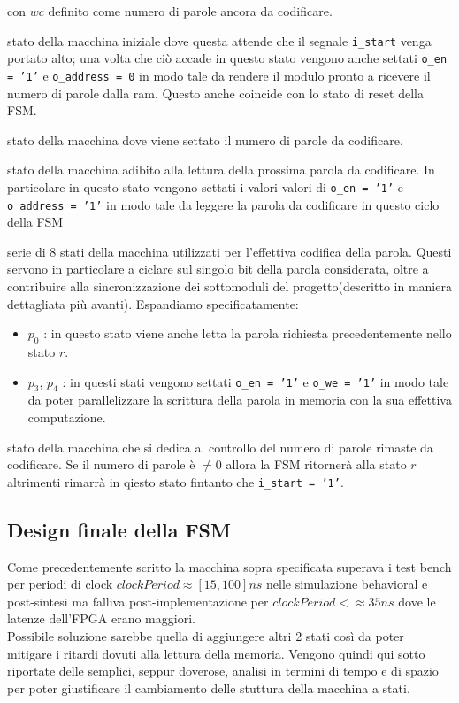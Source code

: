 \documentclass[11pt,a4paper]{article}
\begin{document}
                con $wc$ definito come numero di parole ancora da codificare.
                \begin{description}[leftmargin = 0cm]
                    \item[Idle - $idle$ : ] stato della macchina iniziale dove questa attende che il segnale \texttt{i\_start} venga portato alto; una volta che ciò accade in questo stato vengono anche settati \texttt{o\_en = '1'} e \texttt{o\_address = 0} in modo tale da rendere il modulo pronto a ricevere il numero di parole dalla ram. Questo anche coincide con lo stato di reset della FSM.
                    \item[Read word count - $r_{wc}$ : ] stato della macchina dove viene settato il numero di parole da codificare.
                    \item[Read word - $r$ : ] stato della macchina adibito alla lettura della prossima parola da codificare. In particolare in questo stato vengono settati i valori valori di \texttt{o\_en = '1'} e \texttt{o\_address = '1'} in modo tale da leggere la parola da codificare in questo ciclo della FSM
                    \item[Process - $p_0 \rightarrow p_7$ : ] serie di 8 stati della macchina utilizzati per l'effettiva codifica della parola. Questi servono in particolare a ciclare sul singolo bit della parola considerata, oltre a contribuire alla sincronizzazione dei sottomoduli del progetto(descritto in maniera dettagliata più avanti). Espandiamo specificatamente:
                    \begin{itemize}
                        \item $p_0$ : in questo stato viene anche letta la parola richiesta precedentemente nello stato $r$.
                        \item $p_3$, $p_4$ : in questi stati vengono settati \texttt{o\_en = '1'} e \texttt{o\_we = '1'} in modo tale da poter parallelizzare la scrittura della parola in memoria con la sua effettiva computazione.
                    \end{itemize}
                    \item[Done - $d$ : ] stato della macchina che si dedica al controllo del numero di parole rimaste da codificare. Se il numero di parole è $\neq 0$ allora la FSM ritornerà alla stato $r$ altrimenti rimarrà in qiesto stato fintanto che \texttt{i\_start = '1'}.
                \end{description}
        \subsection{Design finale della FSM}
            Come precedentemente scritto la macchina sopra specificata superava i test bench per periodi di clock $clockPeriod \approx [15,100] ns$ nelle simulazione behavioral e post-sintesi ma falliva post-implementazione per $clockPeriod <\approx 35 ns$ dove le latenze dell'FPGA erano maggiori.\\
            Possibile soluzione sarebbe quella di aggiungere altri 2 stati così da poter mitigare i ritardi dovuti alla lettura della memoria. Vengono quindi qui sotto riportate delle semplici, seppur doverose, analisi in termini di tempo e di spazio per poter giustificare il cambiamento delle stuttura della macchina a stati.
\end{document}

